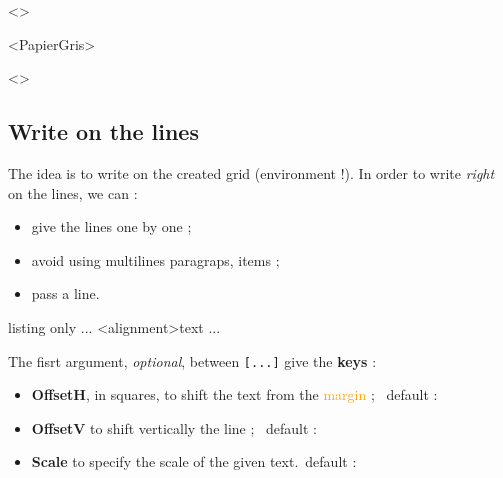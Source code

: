 \documentclass[a4paper]{article}
\newcommand\Cle[1]{{\bfseries\sffamily\textlangle #1\textrangle}}
\begin{document}
\medskip

\begin{EnvGrid}[NumSquares=18x4,Grid=Seyes,Margin=3]<\ColSeyes>
\end{EnvGrid}

\smallskip

\begin{EnvGrid}[NumSquares=36x8,Enlarge=3/3]<PapierGris>
\end{EnvGrid}

\smallskip

\begin{center}
	\begin{EnvGrid}[NumSquares=12x3,Grid=Ruled,Margin=2]<\ColRuled>
	\end{EnvGrid}
\end{center}

\pagebreak

\subsection{Write on the lines}

The idea is to write on the created grid (environment !). In order to write \textit{right} on the lines, we can :

\begin{itemize}
	\item give the lines one by one ;
	\item avoid using multilines paragraps, items ;
	\item pass a line.
\end{itemize}

\begin{PresentationCode}{listing only}
...
	\WriteLine[keys]<alignment>{text}
	\PassLine
...
\end{PresentationCode}

The fisrt argument, \textit{optional}, between \texttt{[...]} give the \Cle{keys} :

\begin{itemize}
	\item \Cle{OffsetH}, in squares, to shift the text from the \textcolor{orange}{margin} ; \hfill~default : \Cle{0}
	\item \Cle{OffsetV} to shift vertically the line ; \hfill~default : \Cle{0pt}
	\item \Cle{Scale} to specify the scale of the given text.\hfill~default : \Cle{1}
\end{itemize}
\end{document}
